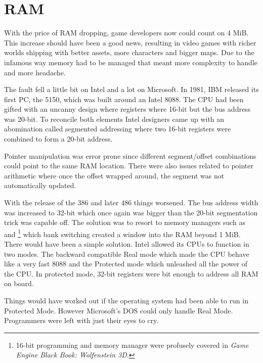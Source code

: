 \section{RAM}
With the price of RAM dropping, game developers now could count on 4 MiB. This increase should have been a good news, resulting in video games with richer worlds shipping with better assets, more characters and bigger maps. Due to the infamous way memory had to be managed that meant more complexity to handle and more headache.\\
\par
The fault fell a little bit on Intel and a lot on Microsoft. In 1981, IBM released its first PC, the 5150,  which was built around an Intel 8088. The CPU had been gifted with an uncanny design where registers where 16-bit but the bus address was 20-bit. To reconcile both elements Intel designers came up with an abomination called segmented addressing where two 16-bit registers were combined to form a 20-bit address.\\
\par


\par
Pointer manipulation was error prone since different segment/offset combinations could point to the same RAM location. There were also issues related to pointer arithmetic where once the offset wrapped around, the segment was not automatically updated.\\
\par
With the release of the 386 and later 486 things worsened. The bus address width was increased to 32-bit which once again was bigger than the 20-bit segmentation trick was capable off. The solution was to resort to memory managers such as  and \footnote{16-bit programming and memory manager were profusely covered in \textit{Game Engine Black Book: Wolfenstein 3D}.} which  bank switching created a window into the RAM beyond 1 MiB.\\

There would have been a simple solution. Intel allowed its CPUs to function in two modes. The backward compatible Real mode which made the CPU behave like a very fast 8088 and the Protected mode which unleashed all the power of the CPU. In protected mode, 32-bit registers were bit enough to address all RAM on board.\\
\par
Things would have worked out if the operating system had been able to run in Protected Mode. However Microsoft's DOS could only handle Real Mode. Programmers were left with just their eyes to cry.\\ 
\par





